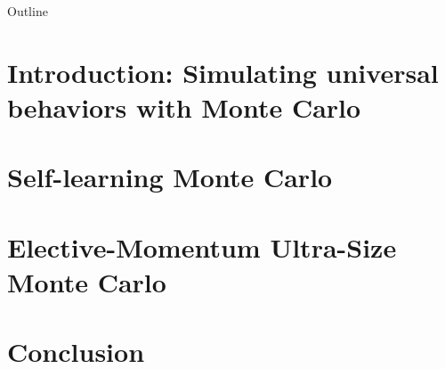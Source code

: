 \documentclass[xcolor=table, 10pt, aspectratio=43]{beamer}
\begin{document}
\begin{frame}{Outline}
		\tableofcontents
\end{frame}

\section{Introduction: Simulating universal behaviors with Monte Carlo}

\section{Self-learning Monte Carlo}

\section{Elective-Momentum Ultra-Size Monte Carlo}

\section{Conclusion}
\end{document}
